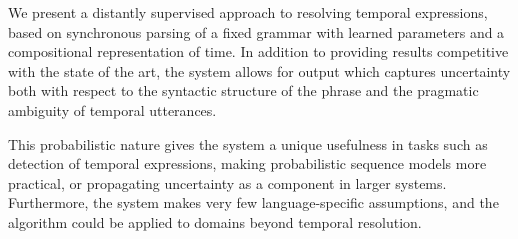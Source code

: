 We present a distantly supervised approach to resolving temporal expressions,
	based on synchronous parsing of a fixed grammar with learned parameters
	and a compositional representation of time.
In addition to providing results competitive with the state of the art,
	the system allows for output which captures uncertainty both with respect to 
	the syntactic structure of the phrase and the pragmatic ambiguity of 
	temporal utterances.

This probabilistic nature gives the system a unique usefulness
	in tasks such as detection of temporal expressions, making probabilistic
	sequence models more practical, or propagating uncertainty as a
	component in larger systems.
Furthermore, the system makes very few language-specific assumptions,
	and the algorithm could be applied to domains beyond temporal resolution.
